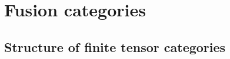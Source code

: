     \chapter{Fusion categories}
        \begin{abstract}
            
        \end{abstract}
        
        \minitoc
        
        
        
        
        
        
    
    \begin{appendices}
        \chapter{Structure of finite tensor categories}
            \begin{abstract}
            
            \end{abstract}
            
            \minitoc
        
            
            
            
    \end{appendices}
	
	\printbibliography

